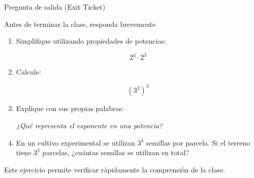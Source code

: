 \documentclass[aspectratio=169,10pt,handout]{beamer}
\begin{document}
	\begin{frame}{Pregunta de salida (Exit Ticket)}
		
		\begin{block}{Antes de terminar la clase, responda brevemente}
			
			\begin{enumerate}
				
				\item Simplifique utilizando propiedades de potencias:
				
				\[
				2^4 \cdot 2^3
				\]
				
				\pause
				
				\item Calcule:
				
				\[
				(3^2)^3
				\]
				
				\pause
				
				\item Explique con sus propias palabras:
				
				\textit{¿Qué representa el exponente en una potencia?}
				
				\pause
				
				\item En un cultivo experimental se utilizan \(3^4\) semillas por parcela.  
				Si el terreno tiene \(3^2\) parcelas, ¿cuántas semillas se utilizan en total?
				
			\end{enumerate}
			
		\end{block}
		
		\vspace{0.2cm}
		
		\centering
		{\small \textcolor{WarmGray}{Este ejercicio permite verificar rápidamente la comprensión de la clase.}}
		
	\end{frame}
	
\end{document}
